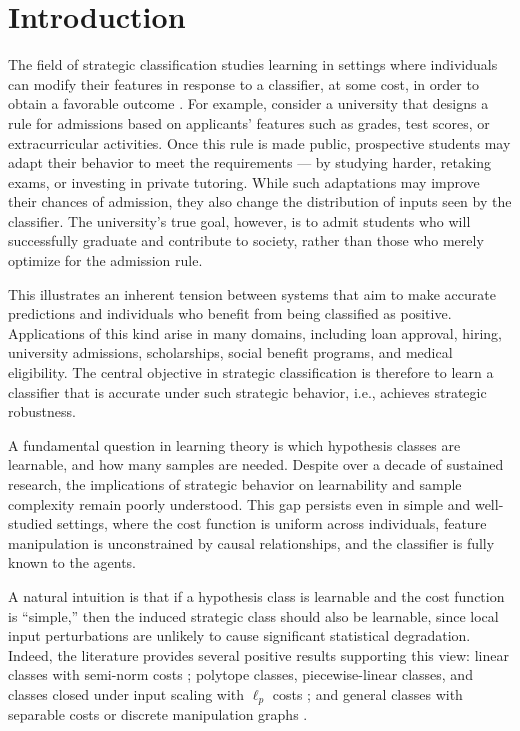 \documentclass[11pt]{article}
\theoremstyle{plain}
\theoremstyle{definition}
\theoremstyle{remark}
\begin{document}
\section{Introduction}
The field of strategic classification studies learning in settings where individuals can modify their features in response to a classifier, at some cost, in order to obtain a favorable outcome \citep{bruckner2012static,hardt2016strategic}.  
For example, consider a university that designs a rule for admissions based on applicants’ features such as grades, test scores, or extracurricular activities. Once this rule is made public, prospective students may adapt their behavior to meet the requirements --- by studying harder, retaking exams, or investing in private tutoring. While such adaptations may improve their chances of admission, they also change the distribution of inputs seen by the classifier. The university’s true goal, however, is to admit students who will successfully graduate and contribute to society, rather than those who merely optimize for the admission rule.  

This illustrates an inherent tension between systems that aim to make accurate predictions and individuals who benefit from being classified as positive. Applications of this kind arise in many domains, including loan approval, hiring, university admissions, scholarships, social benefit programs, and medical eligibility. The central objective in strategic classification is therefore to learn a classifier that is accurate under such strategic behavior, i.e., achieves strategic robustness. 


A fundamental question in learning theory is which hypothesis classes are learnable, and 
{how many samples are needed.}
Despite over a decade of sustained research,
the implications of strategic behavior on learnability and sample complexity
remain poorly understood.
This gap persists even in simple and well-studied settings,
where the cost function is uniform across individuals,
feature manipulation is unconstrained by causal relationships,
and the classifier is fully known to the agents.


A natural intuition is that if a hypothesis class is learnable and the cost function is ``simple,''
then the induced strategic class should also be learnable,
since local input perturbations are unlikely to cause significant statistical degradation.
Indeed, the literature provides several positive results supporting this view:
linear classes with semi-norm costs \citep{zhang2021incentive,sundaram2023pac};
polytope classes, piecewise-linear classes, and classes closed under input scaling with $\ell_p$ costs \citep{trachtenberg2025nonlinear};
and general classes with separable costs \citep{hardt2016strategic}
or discrete manipulation graphs \citep{cohen2024learnability}.
\end{document}
